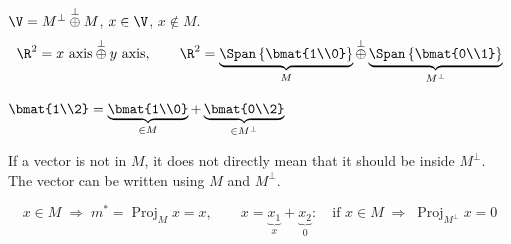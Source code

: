 \begin{note}
$\V = M^\perp \overset{\perp}{\oplus} M$, \quad $x\in \V$, \quad $x\notin M$.
\[
\R^2 = x\text{ axis} \overset{\perp}{\oplus} y \text{ axis}, \qquad
\R^2 = \underbrace{\Span\left\{\bmat{1\\0}\right\}}_{M} \overset{\perp}{\oplus} \underbrace{\Span\left\{\bmat{0\\1}\right\}}_{M^\perp}
\]
\begin{center}
\qquad\qquad
$\displaystyle \bmat{1\\2} = \underbrace{\bmat{1\\0}}_{\in M} + \underbrace{\bmat{0\\2}}_{\in M^\perp}$
\end{center}
If a vector is not in $M$, it does not directly mean that it should be inside $M^\perp$. The vector can be written using $M$ and $M^\perp$.
\end{note}

\[
x\in M \;\Rightarrow\; m^* = \operatorname{Proj}_M x = x,
\qquad
x = \underbrace{x_1}_{x} + \underbrace{x_2}_{0}: \quad \text{if } x\in M \;\Rightarrow\; \operatorname{Proj}_{M^\perp} x = 0
\]

